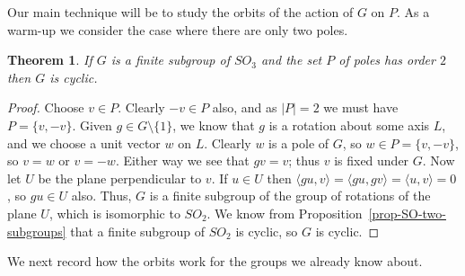 \documentclass{amsart}
\newcommand{\ip}[1]     {\langle #1\rangle}
\newcommand{\sm}        {\setminus}
\renewcommand{\:}{\colon}
\newtheorem{theorem}{Theorem}[section]
\theoremstyle{definition}
\begin{document}
Our main technique will be to study the orbits of the action of $G$ on
$P$.  As a warm-up we consider the case where there are only two
poles.
\begin{theorem}\label{thm-two-poles}
 If $G$ is a finite subgroup of $SO_3$ and the set $P$ of poles has
 order $2$ then $G$ is cyclic.
\end{theorem}
\begin{proof}
 Choose $v\in P$.  Clearly $-v\in P$ also, and as $|P|=2$ we must have
 $P=\{v,-v\}$.  Given $g\in G\sm\{1\}$, we know that $g$ is a rotation
 about some axis $L$, and we choose a unit vector $w$ on $L$.  Clearly
 $w$ is a pole of $G$, so $w\in P=\{v,-v\}$, so $v=w$ or $v=-w$.
 Either way we see that $gv=v$; thus $v$ is fixed under $G$.  Now let
 $U$ be the plane perpendicular to $v$.  If $u\in U$ then
 $\ip{gu,v}=\ip{gu,gv}=\ip{u,v}=0$, so $gu\in U$ also.  Thus, $G$ is a
 finite subgroup of the group of rotations of the plane $U$, which is
 isomorphic to $SO_2$.  We know from
 Proposition~\ref{prop-SO-two-subgroups} that a finite subgroup of
 $SO_2$ is cyclic, so $G$ is cyclic.
\end{proof}

We next record how the orbits work for the groups we already know
about.
\end{document}
